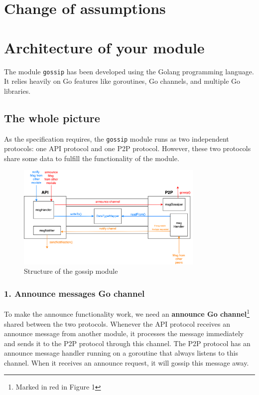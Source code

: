 \section{Change of assumptions}

\section{Architecture of your module}
The module \texttt{gossip} has been developed using the Golang programming language. It relies heavily on Go features like goroutines, Go channels, and multiple Go libraries. 

\subsection{The whole picture}

As the specification requires, the \texttt{gossip} module runs as two independent protocols: one API protocol and one P2P protocol. However, these two protocols share some data to fulfill the functionality of the module. 

\begin{figure}[h]
    \centering
    \includegraphics[width=0.8\textwidth]{pics/structure.png}
    \caption{Structure of the gossip module}
\end{figure}

\subsubsection{1. Announce messages Go channel}

To make the announce functionality work, we need an \textbf{announce Go channel}\footnote{Marked in red in Figure 1} shared between the two protocols. Whenever the API protocol receives an announce message from another module, it processes the message immediately and sends it to the P2P protocol through this channel. The P2P protocol has an announce message handler running on a goroutine that always listens to this channel. When it receives an announce request, it will gossip this message away. 

